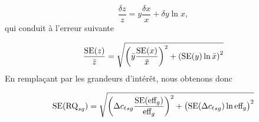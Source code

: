 \documentclass[a4paper,10pt]{article}
\begin{document}
\begin{equation}
 \dfrac{\delta z}{z} = y\dfrac{\delta x}{x}+\delta y \ln x,
\end{equation}
qui conduit à l'erreur suivante

\begin{equation}
 \dfrac{\text{SE}(z)}{\bar{z}} =\sqrt{%
\left(\bar{y}\dfrac{\text{SE}(x)}{\bar{x}}\right)^2+\left(\text{SE}(y) \ln
\bar{x}\right)^2}
\end{equation}
En remplaçant par les grandeurs d'intérêt, nous obtenons donc

\begin{equation}
 \text{SE}(\text{RQ}_{sg}) =\sqrt{%
 \left({\Delta c_t}_{sg}\dfrac{\text{SE}(\text{eff}_g)}{\text{eff}_g}\right)^2+
 \left(\text{SE}({\Delta c_t}_{sg}) \ln \text{eff}_g\right)^2}
\end{equation}
\end{document}
